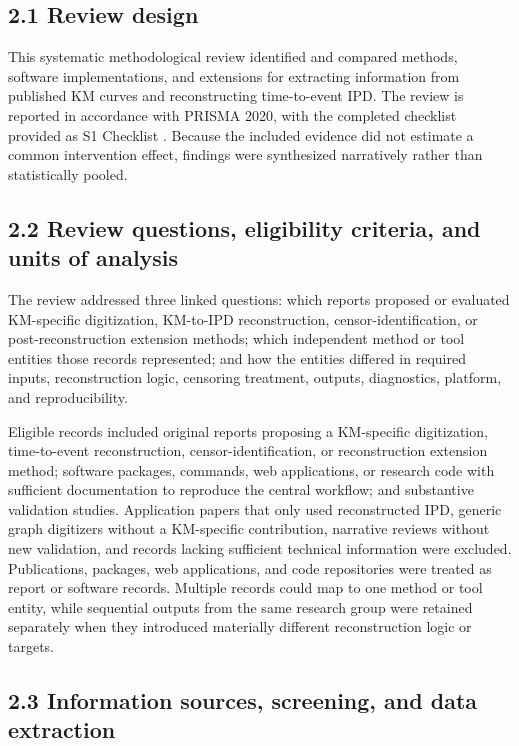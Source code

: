 \documentclass[12pt,letterpaper]{article}
\begin{document}
\subsection*{2.1 Review design}

This systematic methodological review identified and compared methods, software implementations, and extensions for extracting information from published KM curves and reconstructing time-to-event IPD. The review is reported in accordance with PRISMA 2020, with the completed checklist provided as S1 Checklist \cite{page2021}. Because the included evidence did not estimate a common intervention effect, findings were synthesized narratively rather than statistically pooled.

\subsection*{2.2 Review questions, eligibility criteria, and units of analysis}

The review addressed three linked questions: which reports proposed or evaluated KM-specific digitization, KM-to-IPD reconstruction, censor-identification, or post-reconstruction extension methods; which independent method or tool entities those records represented; and how the entities differed in required inputs, reconstruction logic, censoring treatment, outputs, diagnostics, platform, and reproducibility.

Eligible records included original reports proposing a KM-specific digitization, time-to-event reconstruction, censor-identification, or reconstruction extension method; software packages, commands, web applications, or research code with sufficient documentation to reproduce the central workflow; and substantive validation studies. Application papers that only used reconstructed IPD, generic graph digitizers without a KM-specific contribution, narrative reviews without new validation, and records lacking sufficient technical information were excluded. Publications, packages, web applications, and code repositories were treated as report or software records. Multiple records could map to one method or tool entity, while sequential outputs from the same research group were retained separately when they introduced materially different reconstruction logic or targets.

\subsection*{2.3 Information sources, screening, and data extraction}
\end{document}
